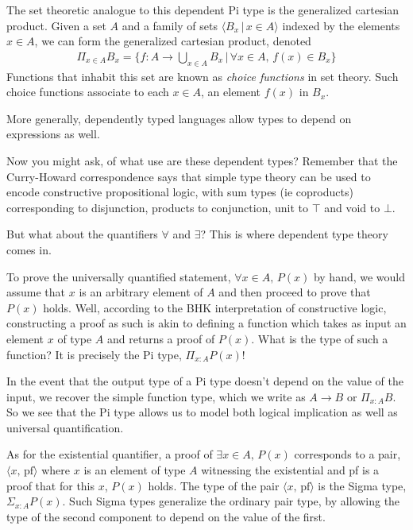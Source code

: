 \documentclass{article}
\begin{document}
The set theoretic analogue to this dependent Pi type is the generalized
cartesian product. Given a set $A$ and a family of sets $\langle B_x \, | \, x
\in A\rangle$ indexed by the
elements $x \in A$, we can form the generalized cartesian product, denoted
\begin{align*}
  \Pi_{x \in A} B_x = \bigg\{ f : A \rightarrow \bigcup_{x \in A} B_x \, | \, \forall x \in A, \, f(x) \in B_x \bigg\}
\end{align*}
Functions that inhabit this set are known as \textit{choice functions} in set
theory. Such choice functions associate to each $x \in A$, an element $f(x)$ in $B_x$.


More generally, dependently typed languages allow types to depend on expressions
as well.

Now you might ask, of what use are these dependent types?
Remember that the Curry-Howard correspondence says that simple type theory
can be used to encode constructive propositional logic,
with sum types (ie coproducts) corresponding to disjunction, products to 
conjunction, unit to $\top$ and void to $\bot$.

But what about the quantifiers $\forall$ and $\exists$?
This is where dependent type theory comes in.

To prove the universally quantified statement, $\forall x \in A, \, P(x)$ by hand,
we would assume that $x$ is an arbitrary element of $A$ and then proceed to prove
that $P(x)$ holds.
Well, according to the BHK interpretation of constructive logic, constructing
a proof as such is akin to defining a function which takes 
as input an element $x$ of type $A$ and returns a proof of $P(x)$.
What is the type of such a function? It is precisely the Pi type, 
$\Pi_{x : A} P(x)$!

In the event that the output type of a Pi type doesn't depend on the value of the
input, we recover the simple function type, which we write as $A \rightarrow B$
or $\Pi_{x : A} B$. So we see that the Pi type allows us to model both
logical implication as well as universal quantification. 

As for the existential quantifier, a proof of $\exists x \in A, \, P(x)$
corresponds to a pair, $\langle x, \, \text{pf} \rangle$ where $x$ is an element
of type $A$ witnessing the existential and pf is a proof that for this $x$, 
$P(x)$ holds. The type of the pair $\langle x, \, \text{pf}\rangle$ is the
Sigma type, $\Sigma_{x : A} P(x)$. Such Sigma types generalize the ordinary pair
type, by allowing the type of the second component to depend on the value of
the first. 
\end{document}

